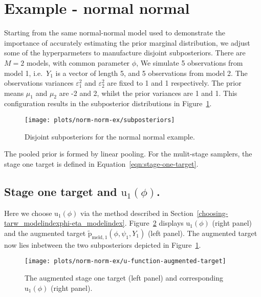 \documentclass[10pt,a4paper,]{article}
\newcommand{\pd}{\text{p}}
\newcommand{\Nm}{M}
\begin{document}
\section{Example - normal normal}\label{example---normal-normal}

Starting from the same normal-normal model used to demonstrate the
importance of accurately estimating the prior marginal distribution, we
adjust some of the hyperparmeters to manufacture disjoint subposteriors.
There are \(\Nm = 2\) models, with common parameter \(\phi\),
 We simulate 5
observations from model 1, i.e.~\(Y_{1}\) is a vector of length 5, and 5
observations from model 2. The observations variances
\(\varepsilon_{1}^{2}\) and \(\varepsilon_{2}^{2}\) are fixed to 1 and 1
respectively. The prior means \(\mu_{1}\) and \(\mu_{2}\) are -2 and 2,
whilst the prior variances are 1 and 1. This configuration results in
the subposterior distributions in Figure~\ref{fig:subposteriors}.

\begin{figure}

{\centering \texttt{[image: plots/norm-norm-ex/subposteriors]} 

}

\caption{Disjoint subposteriors for the normal normal example.}\label{fig:subposteriors}
\end{figure}

The pooled prior is formed by linear pooling. For the mulit-stage
samplers, the stage one target is defined in
Equation~\eqref{eqn:stage-one-target}.

\subsection{\texorpdfstring{Stage one target and
\(\text{u}_{1}(\phi)\).}{Stage one target and \textbackslash{}text\{u\}\_\{1\}(\textbackslash{}phi).}}\label{stage-one-target-and-textu_1phi.}

Here we choose \(\text{u}_{1}(\phi)\) via the method described in
Section~\ref{choosing-tarw_modelindexphi-eta_modelindex}.
Figure~\ref{fig:u_func_augmented_target} displays \(\text{u}_{1}(\phi)\)
(right panel) and the augmented target
\(\tilde{\pd}_{\text{meld}, 1}(\phi, \psi_{1}, Y_{1})\) (left panel).
The augmented target now lies inbetween the two subposteriors depicted
in Figure~\ref{fig:subposteriors}.

\begin{figure}

{\centering \texttt{[image: plots/norm-norm-ex/u-function-augmented-target]} 

}

\caption{The augmented stage one target (left panel) and corresponding $\text{u}_{1}(\phi)$ (right panel).}\label{fig:u_func_augmented_target}
\end{figure}
\end{document}
